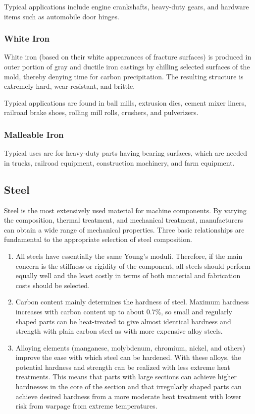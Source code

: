 \documentclass[a4paper,openany,nobib]{tufte-book}
\begin{document}
Typical applications include engine crankshafts, heavy-duty gears, and
hardware items such as automobile door hinges.

\subsubsection{White Iron}
\label{white-iron}
White iron (based on their white appearances of fracture surfaces) is
produced in outer portion of gray and ductile iron castings by chilling
selected surfaces of the mold, thereby denying time for carbon
precipitation. The resulting structure is extremely hard,
wear-resistant, and brittle.

Typical applications are found in ball mills, extrusion dies, cement
mixer liners, railroad brake shoes, rolling mill rolls, crushers, and
pulverizers.

\subsubsection{Malleable Iron}
\label{malleable-iron}
Typical uses are for heavy-duty parts having bearing surfaces, which are
needed in trucks, railroad equipment, construction machinery, and farm
equipment.

\subsection{Steel}
\label{steel}
Steel is the most extensively used material for machine components. By
varying the composition, thermal treatment, and mechanical treatment,
manufacturers can obtain a wide range of mechanical properties. Three
basic relationships are fundamental to the appropriate selection of
steel composition.

\begin{enumerate}
\item All steels have essentially the same Young's moduli. Therefore, if
the main concern is the stiffness or rigidity of the component, all
steels should perform equally well and the least costly in terms of
both material and fabrication costs should be selected.

\item Carbon content mainly determines the hardness of steel. Maximum
hardness increases with carbon content up to about 0.7\%, so small and
regularly shaped parts can be heat-treated to give almost identical
hardness and strength with plain carbon steel as with more expensive
alloy steels.

\item Alloying elements (manganese, molybdenum, chromium, nickel, and
others) improve the ease with which steel can be hardened. With these
alloys, the potential hardness and strength can be realized with less
extreme heat treatments. This means that parts with large sections
can achieve higher hardnesses in the core of the section and that
irregularly shaped parts can achieve desired hardness from a more
moderate heat treatment with lower risk from warpage from extreme
temperatures.
\end{enumerate}
\end{document}
